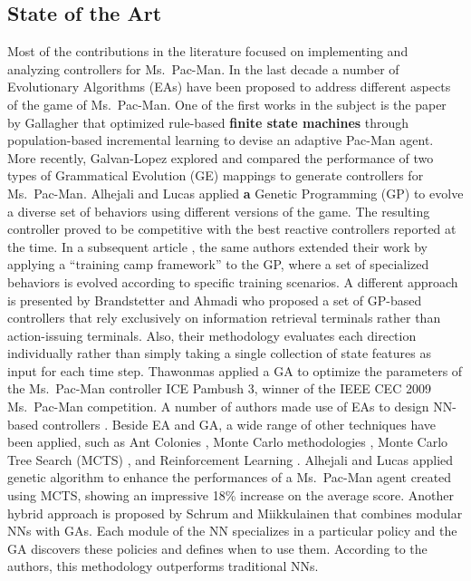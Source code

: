 \documentclass[journal]{IEEEtran}
\begin{document}
\subsection{State of the Art}
Most of the contributions in the literature focused on implementing and analyzing controllers for Ms.\  Pac-Man. In the last decade a number of Evolutionary Algorithms (EAs) have been proposed to address different aspects of the game of Ms.\  Pac-Man. One of the first works in the subject is the paper by Gallagher \cite{Gallagher03} that optimized rule-based \textbf{finite state machines} through population-based incremental learning to devise an adaptive Pac-Man agent. More recently, Galvan-Lopez \cite{Galvan-Lopez10} explored and compared the performance of two types of Grammatical Evolution (GE) mappings to generate controllers for Ms.\  Pac-Man. Alhejali and Lucas \cite{Alhejali10} applied \textbf{a }Genetic Programming (GP) to evolve a diverse set of behaviors using different versions of the game. The resulting controller proved to be competitive with the best reactive controllers reported at the time. In a subsequent article \cite{AlhejaliLucas11}, the same authors extended their work by applying a ``training camp framework'' to the GP, where a set of specialized behaviors is evolved according to specific training scenarios. A different approach is presented by Brandstetter and Ahmadi \cite{Brandstetter12} who proposed a set of GP-based controllers that rely exclusively on information retrieval terminals rather than action-issuing terminals. Also, their methodology evaluates each direction individually rather than simply taking a single collection of state features as input for each time step. Thawonmas \cite{Thawonmas10} applied a GA to optimize the parameters of the Ms.\  Pac-Man controller ICE Pambush 3, winner of the IEEE CEC 2009 Ms.\  Pac-Man competition. A number of authors made use of EAs to design NN-based controllers \cite{Lucas05,Burrow09,Keunhyun10}. Beside EA and GA, a wide range of other techniques have been applied, such as  Ant Colonies \cite{Emilio2010}, Monte Carlo methodologies \cite{Tong2010,Tong2011}, Monte Carlo Tree Search (MCTS) \cite{Samothrakis2011, Ikehata2011}, and Reinforcement Learning \cite{Bom2013}. Alhejali and Lucas \cite{Alhejali2013} applied genetic algorithm to enhance the performances of a Ms.\  Pac-Man agent created using MCTS, showing an impressive 18\% increase on the average score. Another hybrid approach is proposed by Schrum and Miikkulainen \cite{Schrum2014} that combines modular NNs with GAs. Each module of the NN specializes in a particular policy and the GA discovers these policies and defines when to use them. According to the authors, this methodology outperforms traditional NNs.
\end{document}
